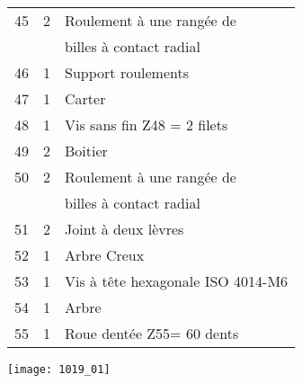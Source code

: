 \begin{multicols}{2}
\begin{center}
\begin{tabular}{|l|l|l|}
45&
2&
Roulement à une rangée de \\ 
&& billes à contact radial \\ \hline %
46&
1&
Support roulements \\ \hline %
47&
1&
Carter \\ \hline %
48&
1&
Vis sans fin Z48 = 2 filets \\ \hline %
49&
2&
Boitier\\ \hline %
50&
2&
Roulement à une rangée de \\ 
&& billes à contact radial\\  \hline %
51&
2&
Joint à deux lèvres \\ \hline %
52&
1&
Arbre Creux\\ \hline %
53&
1&
Vis à tête hexagonale ISO 4014-M6 \\ \hline %
54 & 
1 &
Arbre \\ \hline %
55 &
1&
Roue dentée Z55= 60 dents  \\ \hline %
\end{tabular}
\end{center}

\end{multicols}

\ifprof
\else
\fi

\ifprof
\else
\fi

\ifprof
\else
\fi


\ifprof
\else
\fi


\begin{center}
\texttt{[image: 1019\_01]}
\end{center}


